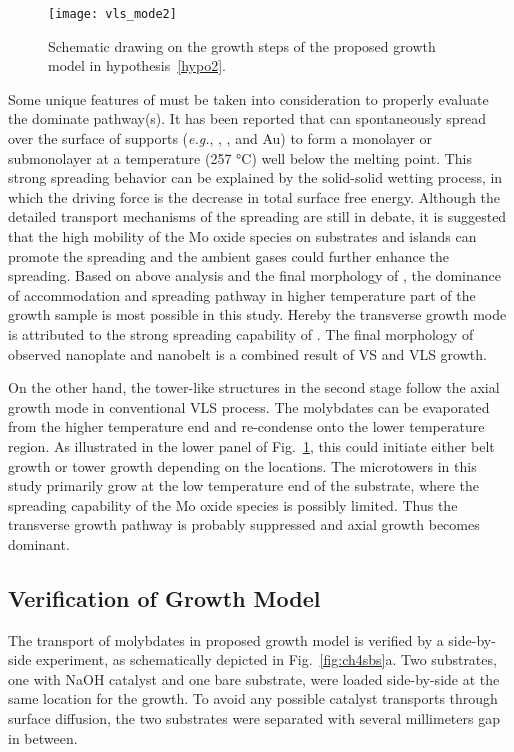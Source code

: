 \begin{figure}[htb]
\centering
\texttt{[image: vls\_mode2]}
\caption[Growth model of ]{Schematic drawing on the growth steps of the proposed growth model in hypothesis~\ref{hypo2}.}
\label{fig:ch4vls}
\end{figure}

Some unique features of  must be taken into consideration to properly evaluate the dominate pathway(s). It has been reported that  can spontaneously spread over the surface of supports (\emph{e.g.}, , , and Au) to form a monolayer or submonolayer at a temperature (257 \si{\degreeCelsius}) well below the melting point.\cite{Leyrer1990} This strong spreading behavior can be explained by the solid-solid wetting process, in which the driving force is the decrease in total surface free energy.\cite{Leyrer1988} Although the detailed transport mechanisms of the spreading are still in debate, it is suggested that the high mobility of the Mo oxide species on substrates and  islands can promote the spreading and the ambient gases could further enhance the spreading.\cite{Gunther2000, Song2003} Based on above analysis and the final morphology of , the dominance of accommodation and spreading pathway in higher temperature part of the growth sample is most possible in this study. Hereby the transverse growth mode is attributed to the strong spreading capability of . The final morphology of observed nanoplate and nanobelt is a combined result of VS and VLS growth. 

On the other hand, the tower-like structures in the second stage follow the axial growth mode in conventional VLS process. The molybdates can be evaporated from the higher temperature end and re-condense onto the lower temperature region. As illustrated in the lower panel of Fig.~\ref{fig:ch4vls}, this could initiate either belt growth or tower growth depending on the locations. The microtowers in this study primarily grow at the low temperature end of the substrate, where the spreading capability of the Mo oxide species is possibly limited. Thus the transverse growth pathway is probably suppressed and axial growth becomes dominant.

\subsection{Verification of Growth Model} 

The transport of molybdates in proposed growth model is verified by a side-by-side experiment, as schematically depicted in Fig.~\ref{fig:ch4sbs}a. Two substrates, one with NaOH catalyst and one bare substrate, were loaded side-by-side at the same location for the growth. To avoid any possible catalyst transports through surface diffusion, the two substrates were separated with several millimeters gap in between. 

